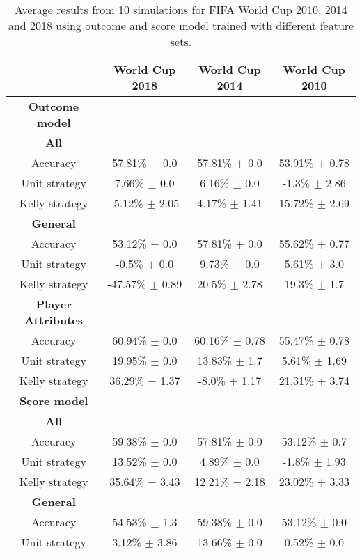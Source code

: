 \begin{table}
    \caption{Average results from 10 simulations for FIFA World Cup 2010, 2014 and 2018 using outcome and score model trained with different feature sets.}
    \begin{tabular}{ | c |c| c | c |}
    \hline
    & World Cup 2018 & World Cup 2014 & World Cup 2010 \\
     \hline
    \hline
    \textbf{Outcome model} \\
    \hline
    \hline
    \textbf{All} \\
    \hline
    Accuracy & 57.81\% $\pm$ 0.0 & 57.81\% $\pm$ 0.0 & 53.91\% $\pm$ 0.78 \\
    Unit strategy& 7.66\% $\pm$ 0.0 & 6.16\% $\pm$ 0.0 & -1.3\% $\pm$ 2.86 \\
    Kelly strategy& -5.12\% $\pm$ 2.05 & 4.17\% $\pm$ 1.41 & 15.72\% $\pm$ 2.69 \\
    \hline
    \textbf{General} \\
    \hline
    Accuracy & 53.12\% $\pm$ 0.0 & 57.81\% $\pm$ 0.0 & 55.62\% $\pm$ 0.77 \\
    Unit strategy & -0.5\% $\pm$ 0.0 & 9.73\% $\pm$ 0.0 & 5.61\% $\pm$ 3.0 \\
    Kelly strategy & -47.57\% $\pm$ 0.89 & 20.5\% $\pm$ 2.78 & 19.3\% $\pm$ 1.7 \\
    \hline
    \textbf{Player Attributes} \\
    \hline
    Accuracy & 60.94\% $\pm$ 0.0 & 60.16\% $\pm$ 0.78 & 55.47\% $\pm$ 0.78 \\
    Unit strategy & 19.95\% $\pm$ 0.0 & 13.83\% $\pm$ 1.7 & 5.61\% $\pm$ 1.69 \\
    Kelly strategy & 36.29\% $\pm$ 1.37 & -8.0\% $\pm$ 1.17 & 21.31\% $\pm$ 3.74 \\
    \hline
    \hline
    \textbf{Score model} \\
    \hline
    \hline
    \textbf{All} \\
    \hline
    Accuracy & 59.38\% $\pm$ 0.0 & 57.81\% $\pm$ 0.0 & 53.12\% $\pm$ 0.7 \\
    Unit strategy & 13.52\% $\pm$ 0.0 & 4.89\% $\pm$ 0.0 & -1.8\% $\pm$ 1.93 \\
    Kelly strategy & 35.64\% $\pm$ 3.43 & 12.21\% $\pm$ 2.18 & 23.02\% $\pm$ 3.33 \\
    \hline
    \textbf{General} \\
    \hline
    Accuracy & 54.53\% $\pm$ 1.3 & 59.38\% $\pm$ 0.0 & 53.12\% $\pm$ 0.0 \\
    Unit strategy & 3.12\% $\pm$ 3.86 & 13.66\% $\pm$ 0.0 & 0.52\% $\pm$ 0.0 \\

\end{tabular}
\end{table}
